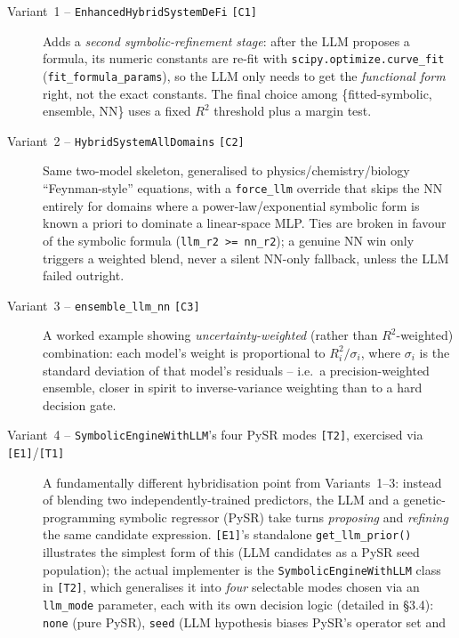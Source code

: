 \documentclass[11pt,a4paper]{article}
\newcommand{\code}[1]{\texttt{\small #1}}
\begin{document}
\begin{description}
  \item[Variant~1 -- \code{EnhancedHybridSystemDeFi} \code{[C1]}] Adds a
        \emph{second symbolic-refinement stage}: after the LLM proposes a
        formula, its numeric constants are re-fit with
        \code{scipy.optimize.curve\_fit} (\code{fit\_formula\_params}), so
        the LLM only needs to get the \emph{functional form} right, not the
        exact constants. The final choice among \{fitted-symbolic,
        ensemble, NN\} uses a fixed $R^2$ threshold plus a margin test.
  \item[Variant~2 -- \code{HybridSystemAllDomains} \code{[C2]}] Same
        two-model skeleton, generalised to physics/chemistry/biology
        ``Feynman-style'' equations, with a \code{force\_llm} override that
        skips the NN entirely for domains where a power-law/exponential
        symbolic form is known a priori to dominate a linear-space MLP.
        Ties are broken in favour of the symbolic formula (\code{llm\_r2 >=
        nn\_r2}); a genuine NN win only triggers a weighted blend, never a
        silent NN-only fallback, unless the LLM failed outright.
  \item[Variant~3 -- \code{ensemble\_llm\_nn} \code{[C3]}] A worked example
        showing \emph{uncertainty-weighted} (rather than $R^2$-weighted)
        combination: each model's weight is proportional to
        $R^2_i/\sigma_i$, where $\sigma_i$ is the standard deviation of that
        model's residuals -- i.e.\ a precision-weighted ensemble, closer in
        spirit to inverse-variance weighting than to a hard decision gate.
  \item[Variant~4 -- \code{SymbolicEngineWithLLM}'s four PySR modes
        \code{[T2]}, exercised via \code{[E1]}/\code{[T1]}] A fundamentally
        different hybridisation point from Variants~1--3: instead of
        blending two independently-trained predictors, the LLM and a
        genetic-programming symbolic regressor (PySR) take turns
        \emph{proposing} and \emph{refining} the same candidate expression.
        \code{[E1]}'s standalone \code{get\_llm\_prior()} illustrates the
        simplest form of this (LLM candidates as a PySR seed population);
        the actual implementer is the \code{SymbolicEngineWithLLM} class in
        \code{[T2]}, which generalises it into \emph{four} selectable
        modes chosen via an \code{llm\_mode} parameter, each with its own
        decision logic (detailed in \S3.4): \code{none} (pure PySR),
        \code{seed} (LLM hypothesis biases PySR's operator set and

\end{description}
\end{document}
